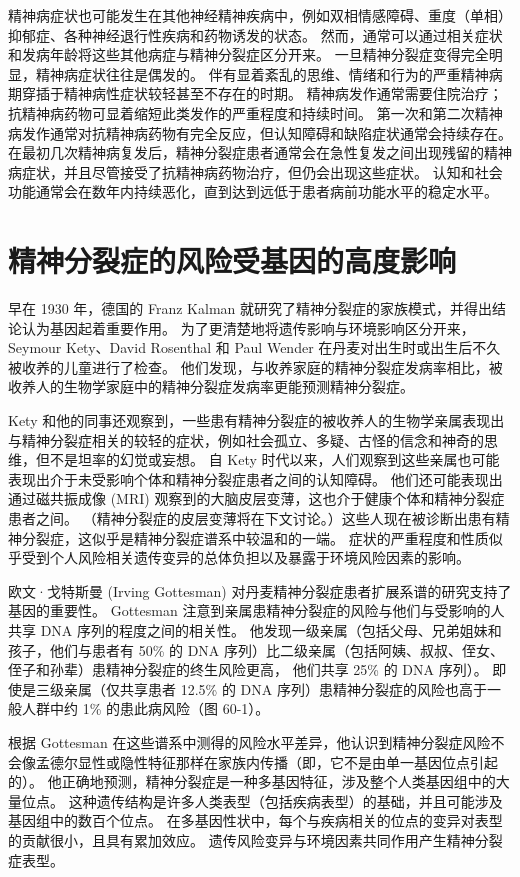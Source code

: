 精神病症状也可能发生在其他神经精神疾病中，例如双相情感障碍、重度（单相）抑郁症、各种神经退行性疾病和药物诱发的状态。 然而，通常可以通过相关症状和发病年龄将这些其他病症与精神分裂症区分开来。 一旦精神分裂症变得完全明显，精神病症状往往是偶发的。 伴有显着紊乱的思维、情绪和行为的严重精神病期穿插于精神病性症状较轻甚至不存在的时期。 精神病发作通常需要住院治疗； 抗精神病药物可显着缩短此类发作的严重程度和持续时间。 第一次和第二次精神病发作通常对抗精神病药物有完全反应，但认知障碍和缺陷症状通常会持续存在。 在最初几次精神病复发后，精神分裂症患者通常会在急性复发之间出现残留的精神病症状，并且尽管接受了抗精神病药物治疗，但仍会出现这些症状。 认知和社会功能通常会在数年内持续恶化，直到达到远低于患者病前功能水平的稳定水平。


\section{精神分裂症的风险受基因的高度影响}
早在 1930 年，德国的 Franz Kalman 就研究了精神分裂症的家族模式，并得出结论认为基因起着重要作用。 为了更清楚地将遗传影响与环境影响区分开来，Seymour Kety、David Rosenthal 和 Paul Wender 在丹麦对出生时或出生后不久被收养的儿童进行了检查。 他们发现，与收养家庭的精神分裂症发病率相比，被收养人的生物学家庭中的精神分裂症发病率更能预测精神分裂症。

Kety 和他的同事还观察到，一些患有精神分裂症的被收养人的生物学亲属表现出与精神分裂症相关的较轻的症状，例如社会孤立、多疑、古怪的信念和神奇的思维，但不是坦率的幻觉或妄想。 自 Kety 时代以来，人们观察到这些亲属也可能表现出介于未受影响个体和精神分裂症患者之间的认知障碍。 他们还可能表现出通过磁共振成像 (MRI) 观察到的大脑皮层变薄，这也介于健康个体和精神分裂症患者之间。 （精神分裂症的皮层变薄将在下文讨论。）这些人现在被诊断出患有精神分裂症，这似乎是精神分裂症谱系中较温和的一端。 症状的严重程度和性质似乎受到个人风险相关遗传变异的总体负担以及暴露于环境风险因素的影响。

欧文·戈特斯曼 (Irving Gottesman) 对丹麦精神分裂症患者扩展系谱的研究支持了基因的重要性。 Gottesman 注意到亲属患精神分裂症的风险与他们与受影响的人共享 DNA 序列的程度之间的相关性。 他发现一级亲属（包括父母、兄弟姐妹和孩子，他们与患者有 50\% 的 DNA 序列）比二级亲属（包括阿姨、叔叔、侄女、侄子和孙辈）患精神分裂症的终生风险更高， 他们共享 25\% 的 DNA 序列）。 即使是三级亲属（仅共享患者 12.5\% 的 DNA 序列）患精神分裂症的风险也高于一般人群中约 1\% 的患此病风险（图 60-1）。

根据 Gottesman 在这些谱系中测得的风险水平差异，他认识到精神分裂症风险不会像孟德尔显性或隐性特征那样在家族内传播（即，它不是由单一基因位点引起的）。 他正确地预测，精神分裂症是一种多基因特征，涉及整个人类基因组中的大量位点。 这种遗传结构是许多人类表型（包括疾病表型）的基础，并且可能涉及基因组中的数百个位点。 在多基因性状中，每个与疾病相关的位点的变异对表型的贡献很小，且具有累加效应。 遗传风险变异与环境因素共同作用产生精神分裂症表型。


